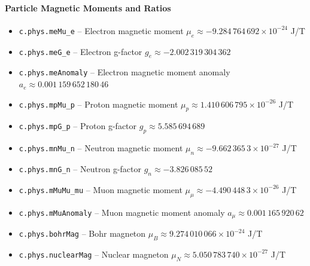 \paragraph{Particle Magnetic Moments and Ratios}
\begin{itemize}
\item \texttt{c.phys.meMu\_e} -- Electron magnetic moment $\mu_e \approx -9.284\,764\,692 \times 10^{-24}$ J/T
\item \texttt{c.phys.meG\_e} -- Electron g-factor $g_e \approx -2.002\,319\,304\,362$
\item \texttt{c.phys.meAnomaly} -- Electron magnetic moment anomaly $a_e \approx 0.001\,159\,652\,180\,46$
\item \texttt{c.phys.mpMu\_p} -- Proton magnetic moment $\mu_p \approx 1.410\,606\,795 \times 10^{-26}$ J/T
\item \texttt{c.phys.mpG\_p} -- Proton g-factor $g_p \approx 5.585\,694\,689$
\item \texttt{c.phys.mnMu\_n} -- Neutron magnetic moment $\mu_n \approx -9.662\,365\,3 \times 10^{-27}$ J/T
\item \texttt{c.phys.mnG\_n} -- Neutron g-factor $g_n \approx -3.826\,085\,52$
\item \texttt{c.phys.mMuMu\_mu} -- Muon magnetic moment $\mu_\mu \approx -4.490\,448\,3 \times 10^{-26}$ J/T
\item \texttt{c.phys.mMuAnomaly} -- Muon magnetic moment anomaly $a_\mu \approx 0.001\,165\,920\,62$
\item \texttt{c.phys.bohrMag} -- Bohr magneton $\mu_B \approx 9.274\,010\,066 \times 10^{-24}$ J/T
\item \texttt{c.phys.nuclearMag} -- Nuclear magneton $\mu_N \approx 5.050\,783\,740 \times 10^{-27}$ J/T
\end{itemize}

